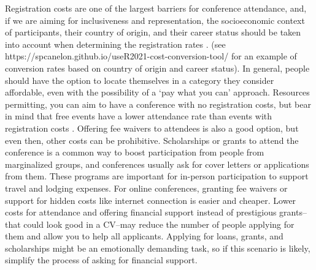 \documentclass[10pt,letterpaper]{article}
\begin{document}
Registration costs are one of the largest barriers for conference attendance, and, if we are aiming for inclusiveness and representation, the socioeconomic context of participants, their country of origin, and their career status should be taken into account when determining the registration rates \cite{sarabipourChangingScientificMeetings2021, andalibPostdocQueueLabour2018, kaplanPostdocNot2012}.
(see https://spcanelon.github.io/useR2021-cost-conversion-tool/ for an example of conversion rates based on country of origin and career status). 
In general, people should have the option to locate themselves in a category they consider affordable, even with the possibility of a `pay what you can' approach. 
Resources permitting, you can aim to have a conference with no registration costs, but bear in mind that free events have a lower attendance rate than events with registration costs \cite{eventbrite_ultimate_2017}. 
Offering fee waivers to attendees is also a good option, but even then, other costs can be prohibitive. 
Scholarships or grants to attend the conference is a common way to boost participation from people from marginalized groups, and conferences usually ask for cover letters or applications from them. 
These programs are important for in-person participation to support travel and lodging expenses. 
For online conferences, granting fee waivers or support for hidden costs like internet connection is easier and cheaper. 
Lower costs for attendance and offering financial support instead of prestigious grants--that could look good in a CV--may reduce the number of people applying for them and allow you to help all applicants. 
Applying for loans, grants, and scholarships might be an emotionally demanding task, so if this scenario is likely, simplify the process of asking for financial support. 

\end{document}
